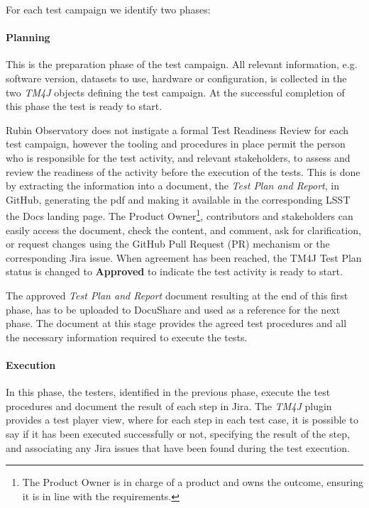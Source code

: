 For each test campaign we identify two phases:

\paragraph{Planning}
This is the preparation phase of the test campaign. All relevant information, e.g. software version, datasets to use, 
hardware or configuration, is  collected in the two \textit{TM4J} objects defining the test campaign.
At the successful completion of this phase the test is ready to start.

Rubin Observatory does not instigate a formal Test Readiness Review for each test campaign,
however the tooling and procedures in place permit the person who is responsible for the test activity, and relevant stakeholders, 
to assess and review the readiness of the activity before the execution of the tests.
This is done by extracting the information into a document, the \textit{Test Plan and Report}, in GitHub, generating the pdf and making it available
in the corresponding LSST the Docs landing page. The Product Owner\footnote{The Product Owner is in charge of a product and owns the outcome, ensuring it is in line with the requirements.}, contributors and stakeholders can easily access the document,
check the content, and comment, ask for clarification, or request changes using the GitHub
Pull Request (PR) mechanism or the corresponding Jira issue. 
When agreement has been reached, the TM4J Test Plan status is changed to \textbf{Approved} to indicate the test activity is ready to start.

The approved \textit{Test Plan and Report} document resulting at the end of this first phase, has to be uploaded to DocuShare 
and used as a reference for the next phase. The document at this stage provides the agreed test procedures and all the necessary 
information required to execute the tests.

\paragraph{Execution}
In this phase, the testers, identified in the previous phase, execute the test procedures and
document the result of each step in Jira.
The \textit{TM4J} plugin provides a test player view, where for each step in each test case, it is possible to say if it has been executed successfully or not,
specifying the result of the step, and associating any Jira issues that have been found during the test execution.


